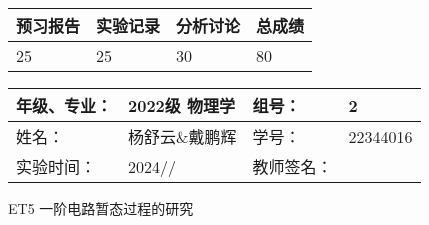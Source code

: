 \documentclass[dvipsnames, svgnames,a4paper,11pt]{article}
\begin{document}
	
	
	
	
	\begin{table}
		\renewcommand\arraystretch{1.7}
		\begin{tabularx}{\textwidth}{
				|X|X|X|X
				|X|X|X|X|}
			\hline
			\multicolumn{2}{|c|}{预习报告}&\multicolumn{2}{|c|}{实验记录}&\multicolumn{2}{|c|}{分析讨论}&\multicolumn{2}{|c|}{总成绩}\\
			\hline
			\LARGE25 & & \LARGE25 & & \LARGE30 & & \LARGE80 & \\
			\hline
		\end{tabularx}
	\end{table}
	
	\begin{table}
		\renewcommand\arraystretch{1.7}
		\begin{tabularx}{\textwidth}{|X|X|X|X|}
			\hline
			年级、专业： & 2022级 物理学 &组号： & 2\\
			\hline
			姓名： & 杨舒云\&戴鹏辉  & 学号： & 22344016\\
			\hline
			实验时间： & 2024// & 教师签名： & \\
			\hline
		\end{tabularx}
	\end{table}
	
	\begin{center}
		\LARGE ET5 \quad 一阶电路暂态过程的研究
	\end{center}
	
	
\end{document}

